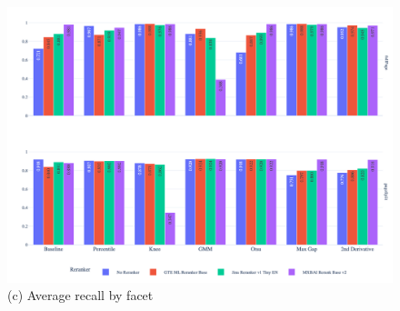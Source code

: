 \begin{figure}[htbp]
{\begin{minipage}{0.90\paperwidth}
      \vspace{1ex}

      \begin{minipage}[b]{0.49\textwidth}
        \centering
        \includegraphics[width=\textwidth]{reranker/avg_recall_bar_faceted.png}
        \\[1ex]\footnotesize (c) Average recall by facet
      \end{minipage}

      \vspace{1ex}


\end{minipage}}
\end{figure}
